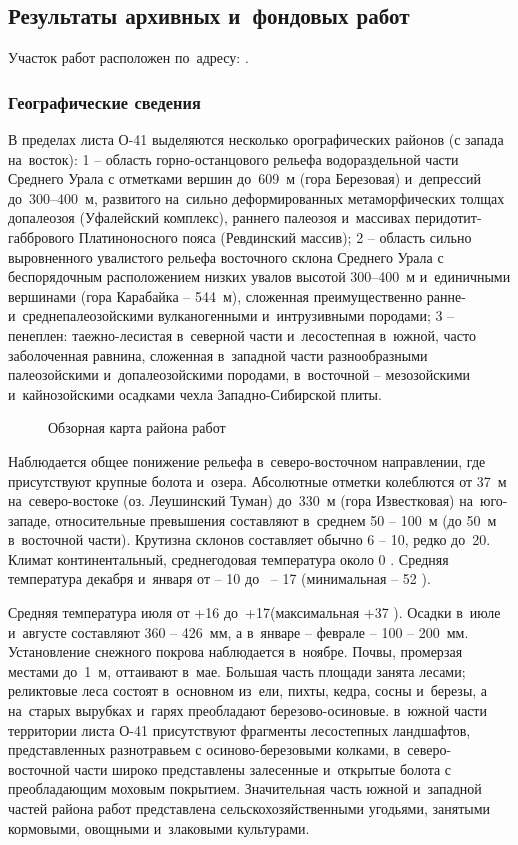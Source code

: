 \subsection{Результаты архивных и~фондовых работ}
Участок работ расположен по~адресу: \txtAddress.

\subsubsection{Географические сведения}
В пределах листа О-41 выделяются несколько орографических районов (с запада на~восток): 1 -- область горно-останцового рельефа водораздельной части Среднего Урала с отметками вершин до~609~м (гора Березовая) и~депрессий до~300--400~м, развитого на~сильно деформированных метаморфических толщах допалеозоя (Уфалейский комплекс), раннего палеозоя и~массивах перидотит-габбрового Платиноносного пояса (Ревдинский массив); 2 -- область сильно выровненного увалистого рельефа восточного склона Среднего Урала с беспорядочным расположением низких
увалов высотой 300--400~м и~единичными вершинами (гора Карабайка -- 544~м), сложенная преимущественно ранне- и~среднепалеозойскими вулканогенными и~интрузивными породами; 3  --  пенеплен: таежно-лесистая в~северной части и~лесостепная в~южной, часто заболоченная равнина, сложенная в~западной части разнообразными палеозойскими и~допалеозойскими породами, в~восточной  --  мезозойскими и~кайнозойскими осадками чехла Западно-Сибирской плиты. 
\begin{figure}[h]
	\centering
	\caption{Обзорная карта района работ}
\end{figure}
Наблюдается общее понижение рельефа в~северо-восточном направлении, где присутствуют крупные болота и~озера. Абсолютные отметки колеблются от 37~м на~северо-востоке (оз. Леушинский Туман) до~330~м (гора Известковая) на~юго-западе, относительные превышения составляют в~среднем 50 -- 100~м (до 50~м в~восточной части). Крутизна склонов составляет обычно 6 -- 10\degree, редко до~20\degree.
Климат континентальный, среднегодовая температура около 0 . Средняя температура декабря и~января от  -- 10 до~ -- 17  (минимальная  -- 52 ).

Средняя температура июля от +16 до~+17\degree (максимальная +37 ). Осадки в~июле и~августе составляют 360 -- 426~мм, а в~январе -- феврале  --  100 -- 200~мм.
Установление снежного покрова наблюдается в~ноябре. Почвы, промерзая местами до~1~м, оттаивают в~мае. Большая часть площади занята лесами; реликтовые леса состоят в~основном из~ели, пихты, кедра, сосны и~березы, а на~старых вырубках и~гарях преобладают березово-осиновые. в~южной части территории листа О-41 присутствуют фрагменты лесостепных ландшафтов, представленных разнотравьем с осиново-березовыми колками, в~северо-восточной части широко представлены залесенные и~открытые болота с преобладающим моховым покрытием. Значительная часть южной и~западной частей района работ представлена сельскохозяйственными угодьями, занятыми кормовыми, овощными и~злаковыми культурами. 

